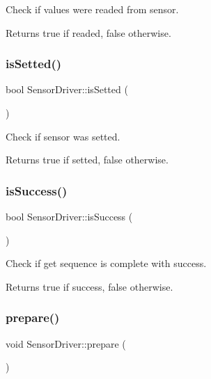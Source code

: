 Check if values were readed from sensor. 

\begin{DoxyReturn}{Returns}
true if readed, false otherwise. 
\end{DoxyReturn}
\mbox{\label{classSensorDriver_a0f64839cf7719b5782c93e54485d3b11}} 
\subsubsection{\texorpdfstring{is\+Setted()}{isSetted()}}
{\footnotesize\ttfamily bool Sensor\+Driver\+::is\+Setted (\begin{DoxyParamCaption}{ }\end{DoxyParamCaption})\hspace{0.3cm}{\ttfamily [virtual]}}



Check if sensor was setted. 

\begin{DoxyReturn}{Returns}
true if setted, false otherwise. 
\end{DoxyReturn}
\mbox{\label{classSensorDriver_af8d094335bc75fbf1390ee5b498eec69}} 
\subsubsection{\texorpdfstring{is\+Success()}{isSuccess()}}
{\footnotesize\ttfamily bool Sensor\+Driver\+::is\+Success (\begin{DoxyParamCaption}{ }\end{DoxyParamCaption})}



Check if get sequence is complete with success. 

\begin{DoxyReturn}{Returns}
true if success, false otherwise. 
\end{DoxyReturn}
\mbox{\label{classSensorDriver_a19e0acad6518cf382fe7e71a7b915506}} 
\subsubsection{\texorpdfstring{prepare()}{prepare()}}
{\footnotesize\ttfamily void Sensor\+Driver\+::prepare (\begin{DoxyParamCaption}{ }\end{DoxyParamCaption})\hspace{0.3cm}{\ttfamily [virtual]}}



